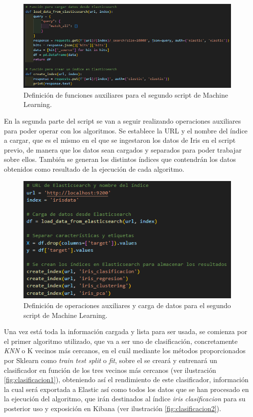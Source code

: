 \begin{figure}
    \centering
    \includegraphics[width=1\linewidth]{img/iris4.png}
    \caption{Definición de funciones auxiliares para el segundo script de Machine Learning.}
    \label{fig:script21}
\end{figure}

En la segunda parte del script se van a seguir realizando operaciones auxiliares para poder operar con los algoritmos. Se establece la URL y el nombre del índice a cargar, que es el mismo en el que se ingestaron los datos de Iris en el script previo, de manera que los datos sean cargados y separados para poder trabajar sobre ellos. También se generan los distintos índices que contendrán los datos obtenidos como resultado de la ejecución de cada algoritmo.

\begin{figure}
    \centering
    \includegraphics[width=1\linewidth]{img/iris5.png}
    \caption{Definición de operaciones auxiliares y carga de datos para el segundo script de Machine Learning.}
    \label{fig:script22}
\end{figure}

Una vez está toda la información cargada y lista para ser usada, se comienza por el primer algoritmo utilizado, que va a ser uno de clasificación, concretamente \textit{KNN} o K vecinos más cercanos, en el cuál mediante los métodos proporcionados por Sklearn como \textit{train test split}  o \textit{fit}, sobre el se creará y entrenará un clasificador en función de los tres vecinos más cercanos  (ver ilustración  \ref{fig:clasificacion1}), obteniendo así el rendimiento de este clasificador, información la cual será exportada a Elastic así como todos los datos que se han procesado en la ejecución del algoritmo, que irán destinados al índice \textit{iris clasificacion} para su posterior uso y exposición en Kibana  (ver ilustración  \ref{fig:clasificacion2}). 


